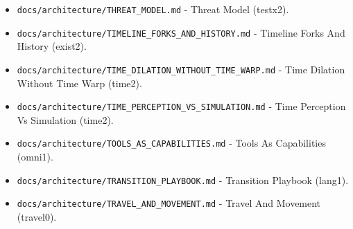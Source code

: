\documentclass[9pt,a4paper,openany]{book}
\begin{document}
\begin{itemize}
\item \texttt{docs/\allowbreak{}architecture/\allowbreak{}THREAT\_\allowbreak{}MODEL.\allowbreak{}md} -\allowbreak{} Threat Model (testx2).\allowbreak{}
\end{itemize}

\begin{itemize}
\item \texttt{docs/\allowbreak{}architecture/\allowbreak{}TIMELINE\_\allowbreak{}FORKS\_\allowbreak{}AND\_\allowbreak{}HISTORY.\allowbreak{}md} -\allowbreak{} Timeline Forks And History (exist2).\allowbreak{}
\end{itemize}

\begin{itemize}
\item \texttt{docs/\allowbreak{}architecture/\allowbreak{}TIME\_\allowbreak{}DILATION\_\allowbreak{}WITHOUT\_\allowbreak{}TIME\_\allowbreak{}WARP.\allowbreak{}md} -\allowbreak{} Time Dilation Without Time Warp (time2).\allowbreak{}
\end{itemize}

\begin{itemize}
\item \texttt{docs/\allowbreak{}architecture/\allowbreak{}TIME\_\allowbreak{}PERCEPTION\_\allowbreak{}VS\_\allowbreak{}SIMULATION.\allowbreak{}md} -\allowbreak{} Time Perception Vs Simulation (time2).\allowbreak{}
\end{itemize}

\begin{itemize}
\item \texttt{docs/\allowbreak{}architecture/\allowbreak{}TOOLS\_\allowbreak{}AS\_\allowbreak{}CAPABILITIES.\allowbreak{}md} -\allowbreak{} Tools As Capabilities (omni1).\allowbreak{}
\end{itemize}

\begin{itemize}
\item \texttt{docs/\allowbreak{}architecture/\allowbreak{}TRANSITION\_\allowbreak{}PLAYBOOK.\allowbreak{}md} -\allowbreak{} Transition Playbook (lang1).\allowbreak{}
\end{itemize}

\begin{itemize}
\item \texttt{docs/\allowbreak{}architecture/\allowbreak{}TRAVEL\_\allowbreak{}AND\_\allowbreak{}MOVEMENT.\allowbreak{}md} -\allowbreak{} Travel And Movement (travel0).\allowbreak{}
\end{itemize}
\end{document}

